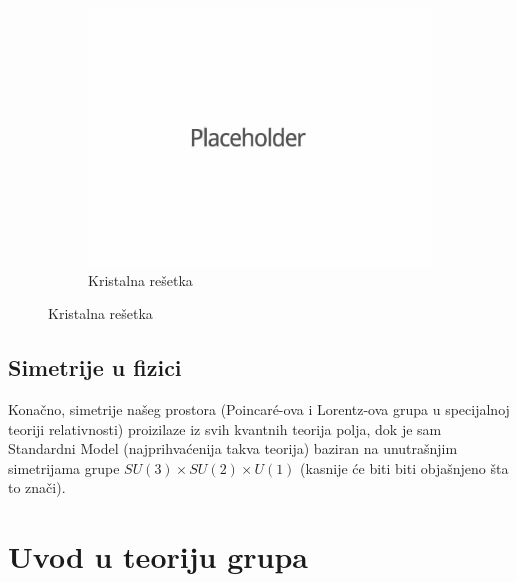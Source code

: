 \documentclass[times, utf8, diplomski]{fer}
\theoremstyle{plain}
\theoremstyle{definition}
\begin{document}
\begin{figure}[h]
\begin{subfigure}{0.3\textwidth}
\includegraphics[width=\textwidth]{placeholder}
\caption{Kristalna re\v setka}
\end{subfigure}
\end{figure}

\section{Simetrije u fizici}
Kona\v cno, simetrije na\v seg prostora (Poincar\'e-ova i Lorentz-ova grupa u specijalnoj teoriji relativnosti) proizilaze iz svih kvantnih teorija polja, dok je sam Standardni Model (najprihva\'cenija takva teorija) baziran na unutra\v snjim simetrijama grupe $SU(3)\times SU(2)\times U(1)$ (kasnije \'ce biti biti obja\v snjeno \v sta to zna\v ci).

\chapter{Uvod u teoriju grupa}
\end{document}
